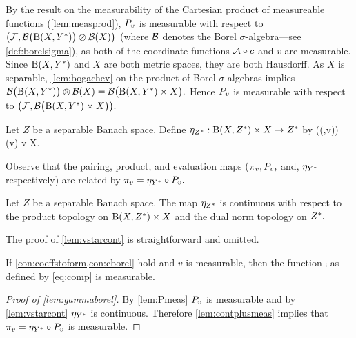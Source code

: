 By the result on the measurability of the Cartesian product of measureable functions (\cref{lem:measprod}), $P_{v}$ is measurable with respect to $\big(\cF,\bigBorel{\homspace}\otimes \Borel{X}\big)$ (where $\mathcal B$ denotes the Borel $\sigma$-algebra---see \cref{def:borelsigma}), as both of the coordinate functions $\mathcal A\circ c$ and $v$ are measurable. Since $\homspace$ and $X$ are both metric spaces, they are both Hausdorff. As $X$ is separable, \cref{lem:bogachev} on the product of Borel $\sigma$-algebras implies $\bigBorel{\homspace} \otimes \Borel{X} = \bigBorel{\homspace \times X}.$ Hence $P_{v}$ is measurable with respect to $\big(\cF,\bigBorel{\homspace\times X}\big).$
\epf

Let $Z$ be a separable Banach space. Define $\eval:\homspaceZ \times X \rightarrow \Zs$ by
\beq\label{eq:evaldef}
\eval\big(\mleft(\cH,v\mright)\big) \de \cH(v) \quad\tfor \cH \in \homspaceZ \tand v \in X.
\eeq
\ede

Observe that the pairing, product, and evaluation maps ($\pi_{v}, P_{v},$ and, $\eta_{Y^{*}}$ respectively) are related by $\pi_{v} = \eta_{Y^{*}} \circ P_{v}.$

\label{lem:vstarcont}
Let $Z$ be a separable Banach space. The map $\eta_{Z^{*}}$ is continuous with respect to the product topology on $\homspaceZ \times X$ and the dual norm topology on $Z^{*}.$
\ele

The proof of \cref{lem:vstarcont} is straightforward and omitted.

 \label{lem:gammaborel}
If  \cref{con:coeffstoform,con:cborel} hold and $v$ is measurable, then the function $\comp$ as defined by \eqref{eq:comp} is measurable.
\ele

\begin{proof}[Proof of \cref{lem:gammaborel}]
By \cref{lem:Pmeas} $P_{v}$ is measurable
 and by \cref{lem:vstarcont} $\eta_{Y^{*}}$ is continuous. Therefore \cref{lem:contplusmeas} implies that $\pi_{v} = \eta_{Y^{*}} \circ P_{v}$ is measurable.
 \end{proof}



